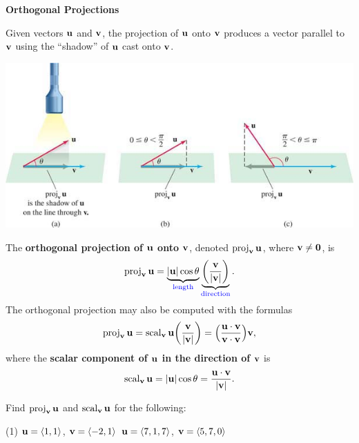 \documentclass[../mathNotesPreamble]{subfiles}
\begin{document}
  \textbf{Orthogonal Projections}

  \noindent
  Given vectors ${\mathbf{u}}$ and ${\mathbf{v}}$, the projection of ${\mathbf{u}}$ onto ${\mathbf{v}}$ produces a vector parallel to ${\mathbf{v}}$ using the ``shadow'' of ${\mathbf{u}}$ cast onto ${\mathbf{v}}$.
  \begin{center}
    \includegraphics[width=0.9\linewidth]{../images/briggs_13_03/fig13_47}
  \end{center}
  \pagebreak

  \begin{defn*}
    The \textbf{orthogonal projection of ${\mathbf{u}}$ onto ${\mathbf{v}}$}, denoted $\operatorname{proj}_{\mathbf{v}} {\mathbf{u}}$, where ${\mathbf{v}}\neq\mathbf{0}$, is
      \[\operatorname{proj}_{\mathbf{v}} {\mathbf{u}} =\underbrace{{\left\vert{\mathbf{u}}\right\vert}\cos\theta}_{\textnormal{\textcolor{blue}{length}}}\underbrace{{\left(\frac{{\mathbf{v}}}{{\left\vert{\mathbf{v}}\right\vert}}\right)}}_{\textnormal{\textcolor{blue}{direction}}}.\]
    The orthogonal projection may also be computed with the formulas
      \[\operatorname{proj}_{\mathbf{v}} {\mathbf{u}}=\operatorname{scal}_{\mathbf{v}} {\mathbf{u}}{\left(\frac{{\mathbf{v}}}{{\left\vert{\mathbf{v}}\right\vert}}\right)}={\left(\frac{{\mathbf{u}}\cdot{\mathbf{v}}}{{\mathbf{v}}\cdot{\mathbf{v}}}\right)}{\mathbf{v}},\]
    where the \textbf{scalar component of ${\mathbf{u}}$ in the direction of ${\mathbf{v}}$} is
      \[\operatorname{scal}_{\mathbf{v}} {\mathbf{u}}={\left\vert{\mathbf{u}}\right\vert}\cos\theta=\frac{{\mathbf{u}}\cdot{\mathbf{v}}}{{\left\vert{\mathbf{v}}\right\vert}}.\]
  \end{defn*}

  \begin{ex*}
    Find $\operatorname{proj}_{\mathbf{v}}{\mathbf{u}}$ and $\operatorname{scal}_{\mathbf{v}}{\mathbf{u}}$ for the following:
    \begin{tasks}[after-item-skip=\stretch{1}, label=\textbullet](1)
      \task ${\mathbf{u}}={\left\langle 1,1 \right\rangle}$, ${\mathbf{v}}={\left\langle -2,1 \right\rangle}$
      \task ${\mathbf{u}}={\left\langle 7,1,7 \right\rangle}$, ${\mathbf{v}}={\left\langle 5,7,0 \right\rangle}$
    \end{tasks}
  \end{ex*}


  \pagebreak
\end{document}
